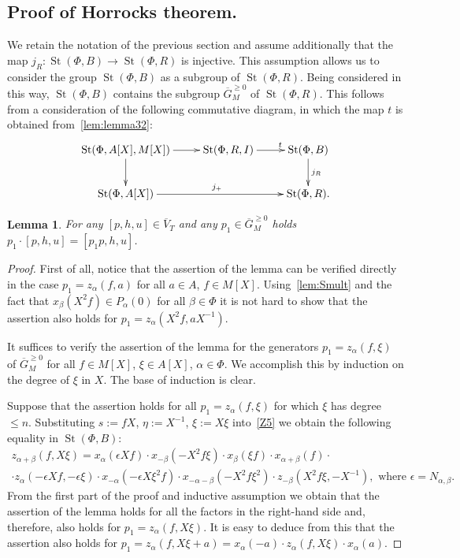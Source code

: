 \documentclass[oneside, 8pt]{amsart}
\newtheorem{lemma}{Lemma}
\theoremstyle{remark}
\theoremstyle{definition}
\numberwithin{lemma}{section}
\numberwithin{prop}{section}
\numberwithin{corollary}{section}
\numberwithin{externaltheorem}{section}
\DeclareMathOperator{\St}{St}
\numberwithin{equation}{section}
\begin{document}
\subsection{Proof of Horrocks theorem.} \label{sec:P1glueing}
We retain the notation of the previous section and assume additionally that the map $j_R \colon \St(\Phi, B) \to \St(\Phi, R)$ is injective.
This assumption allows us to consider the group $\St(\Phi, B)$ as a subgroup of $\St(\Phi, R)$.
Being considered in this way, $\St(\Phi, B)$ contains the subgroup $\overline{G}^{\geq 0}_M$ of $\St(\Phi, R)$.
This follows from a consideration of the following commutative diagram, in which the map $t$ is obtained from~\cref{lem:lemma32}:
\[ \xymatrix{ \St(\Phi, A[X], M[X]) \ar[d] \ar[r] & \St(\Phi, R, I) \ar[r]^(.65){t} & \St(\Phi, B) \ar[d]^{j_R} \\
   \St(\Phi, A[X]) \ar[rr]^{j_+} & & \St(\Phi, R). } \]

\begin{lemma}\label{lem:action} For any $[p, h, u]\in \overline{V}_T$ and any $p_1 \in \overline{G}^{\geq 0}_M$ holds $p_1 \cdot [p, h, u] = [p_1p, h, u]$. \end{lemma}
\begin{proof} First of all, notice that the assertion of the lemma can be verified directly in the case $p_1 = z_\alpha(f, a)$ for all $a\in A$, $f\in M[X]$. Using~\cref{lem:Smult} and the fact that $x_\beta(X^2f) \in P_\alpha(0)$ for all $\beta \in \Phi$ it is not hard to show that the assertion also holds for $p_1 = z_\alpha(X^2f, aX^{-1})$.

It suffices to verify the assertion of the lemma for the generators $p_1 = z_\alpha(f, \xi)$ of $\overline{G}_M^{\geq 0}$ for all $f \in M[X]$, $\xi\in A[X]$, $\alpha \in \Phi$. We accomplish this by 
induction on the degree of $\xi$ in $X$. The base of induction is clear.

Suppose that the assertion holds for all $p_1 = z_\alpha(f, \xi)$ for which $\xi$ has degree $\leq n$.
Substituting $s := fX$, $\eta := X^{-1}$, $\xi := X\xi$ into~\eqref{Z5} we obtain the following equality in $\St(\Phi, B)$:
\begin{multline*}
 z_{\alpha+\beta}(f, X\xi) = x_\alpha(\epsilon Xf) \cdot x_{-\beta}(-X^2 f\xi ) \cdot x_{\beta}(\xi f) \cdot x_{\alpha+\beta}(f) \cdot \\ \cdot z_\alpha(-\epsilon Xf, -\epsilon \xi) \cdot x_{-\alpha}(-\epsilon X\xi^2f) \cdot x_{-\alpha-\beta}(- X^2f \xi^2) \cdot z_{-\beta}(X^2f\xi, -X^{-1}),\text{ where $\epsilon = N_{\alpha, \beta}$.}
\end{multline*}
From the first part of the proof and inductive assumption we obtain that the assertion of the lemma holds for all the factors in the right-hand side and, therefore, also holds  for $p_1 = z_\alpha(f, X\xi)$. It is easy to deduce from this that the assertion also holds for $p_1 = z_\alpha(f, X\xi + a) = x_\alpha(-a) \cdot z_\alpha(f, X\xi) \cdot x_\alpha(a)$. 
\end{proof}
\end{document}
